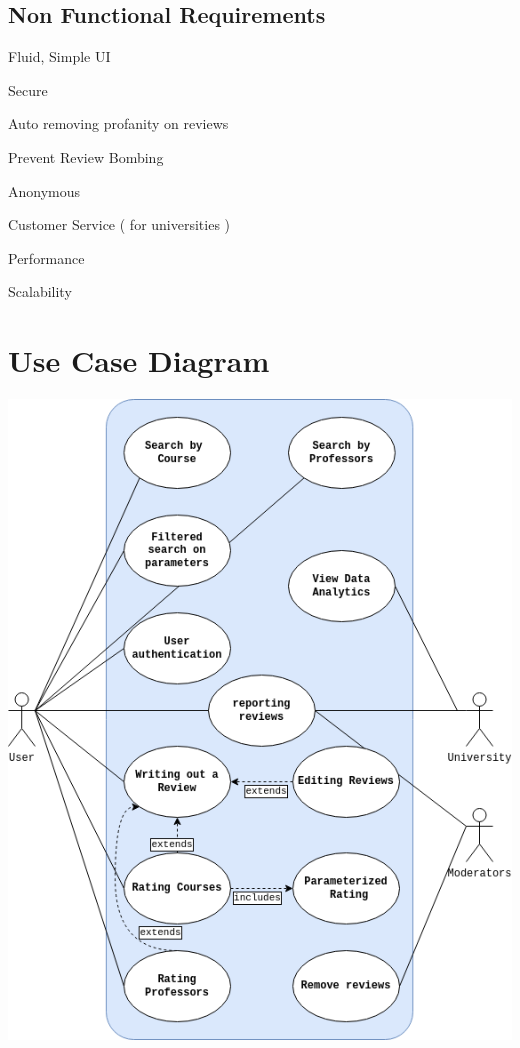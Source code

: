 \documentclass{article}
\begin{document}
\subsection{Non Functional Requirements} 

	\quad Fluid, Simple UI

	\quad Secure

	\quad Auto removing profanity on reviews

	\quad Prevent Review Bombing

	\quad Anonymous

	\quad Customer Service ( for universities )

	\quad Performance

	\quad Scalability

\section{Use Case Diagram} 

\begin{center}
	\includegraphics[scale=0.5]{./USECASE.drawio.png}	
\end{center}
\end{document}
